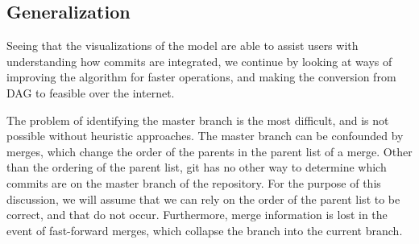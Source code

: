 \subsection{Generalization}
\label{sub:generalization}

Seeing that the visualizations of the \mt model are able to assist users
with understanding how commits are integrated, we continue by looking at
ways of improving the algorithm for faster operations, and making the
conversion from DAG to \mt feasible over the internet.

The problem of identifying the master branch is the most difficult, and is
not possible without heuristic approaches. The master branch can be
confounded by \foxtrot merges, which change the order of the
parents in the parent list of a merge. Other than the ordering of the
parent list, git has no other way to determine which commits are on the
master branch of the repository. For the purpose of this discussion, we
will assume that we can rely on the order of the parent list to be
correct, and that  do not occur. Furthermore, merge
information is lost in the event of fast-forward merges, which collapse
the branch into the current branch.

